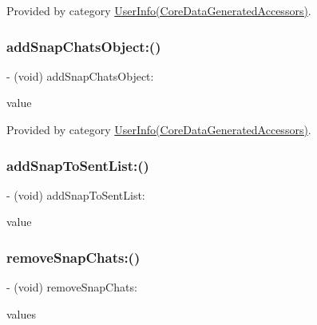 Provided by category \hyperlink{category_user_info_07_core_data_generated_accessors_08_a7f9a4fea0aa960f777e6f5763f6de9f0}{User\+Info(\+Core\+Data\+Generated\+Accessors)}.

\hypertarget{interface_user_info_a60a99590b470d8c11ee23e47ac20b09a}{}\label{interface_user_info_a60a99590b470d8c11ee23e47ac20b09a} 
\subsubsection{\texorpdfstring{add\+Snap\+Chats\+Object\+:()}{addSnapChatsObject:()}}
{\footnotesize\ttfamily -\/ (void) add\+Snap\+Chats\+Object\+: \begin{DoxyParamCaption}\item[{(\hyperlink{interface_snap}{Snap} $\ast$)}]{value }\end{DoxyParamCaption}}



Provided by category \hyperlink{category_user_info_07_core_data_generated_accessors_08_a60a99590b470d8c11ee23e47ac20b09a}{User\+Info(\+Core\+Data\+Generated\+Accessors)}.

\hypertarget{interface_user_info_a1f91afa8dd848ef5aaa3904c7da857dc}{}\label{interface_user_info_a1f91afa8dd848ef5aaa3904c7da857dc} 
\subsubsection{\texorpdfstring{add\+Snap\+To\+Sent\+List\+:()}{addSnapToSentList:()}}
{\footnotesize\ttfamily -\/ (void) add\+Snap\+To\+Sent\+List\+: \begin{DoxyParamCaption}\item[{(\hyperlink{interface_snap}{Snap} $\ast$)}]{value }\end{DoxyParamCaption}}

\hypertarget{interface_user_info_a7b335565ece5b09bb633af92eeaf47eb}{}\label{interface_user_info_a7b335565ece5b09bb633af92eeaf47eb} 
\subsubsection{\texorpdfstring{remove\+Snap\+Chats\+:()}{removeSnapChats:()}}
{\footnotesize\ttfamily -\/ (void) remove\+Snap\+Chats\+: \begin{DoxyParamCaption}\item[{(N\+S\+Set$<$ \hyperlink{interface_snap}{Snap} $\ast$ $>$ $\ast$)}]{values }\end{DoxyParamCaption}}




